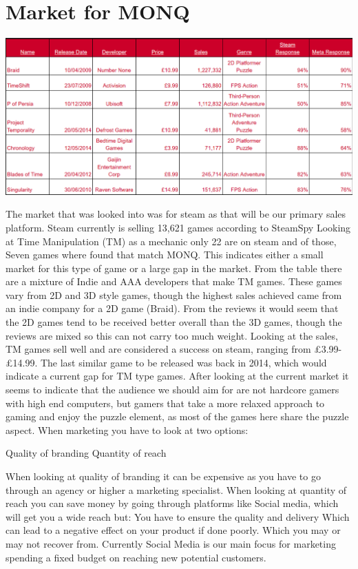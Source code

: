 \documentclass{scrartcl}
\begin{document}
\section{Market for MONQ}
\begin{center}
	\includegraphics[scale=0.4]{ResearchChart}	
	\newline
\end{center}


The market that was looked into was for steam as that will be our primary sales platform.
Steam currently is selling 13,621 games according to SteamSpy
Looking at Time Manipulation (TM) as a mechanic only 22 are on steam and of those, Seven games where found that match MONQ.
This indicates either a small market for this type of game or a large gap in the market.
From the table there are a mixture of Indie and AAA developers that make TM games.
These games vary from 2D and 3D style games, though the highest sales achieved came from an indie company for a 2D game (Braid).
From the reviews it would seem that the 2D games tend to be received better overall than the 3D games, though the reviews are mixed so this can not carry too much weight.
Looking at the sales, TM games sell well and are considered a success on steam, ranging from £3.99-£14.99.
The last similar game to be released was back in 2014, which would indicate a current gap for TM type games.
After looking at the current market it seems to indicate that the audience we should aim for are not hardcore gamers with high end computers, but gamers that take a more relaxed approach to gaming and enjoy the puzzle element, as most of the games here share the puzzle aspect.
\newline
\newline
\newline
\newline	
When marketing you have to look at two options:
\begin{center}
	Quality of branding
	\newline
	Quantity of reach
	\newline
\end{center}
When looking at quality of branding it can be expensive as you have to go through an agency or higher a marketing specialist.
When looking at quantity of reach you can save money by going through platforms like Social media, which will get you a wide reach but:
You have to ensure the quality and delivery 
Which can lead to a negative effect on your product if done poorly.
Which you may or may not recover from.
Currently Social Media is our main focus for marketing spending a fixed budget on reaching new potential customers.
\end{document}
